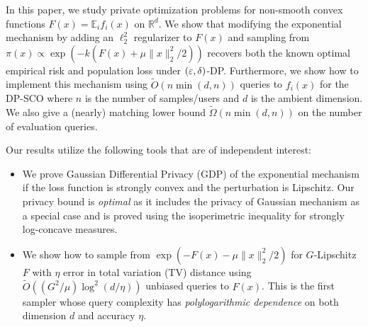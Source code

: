 In this paper, we study private optimization problems for non-smooth convex functions $F(x)=\mathbb{E}_i f_i(x)$ on $\mathbb{R}^d$.
We show that modifying the exponential mechanism by adding an $\ell_2^2$ regularizer to $F(x)$ and sampling from $\pi(x)\propto \exp(-k(F(x)+\mu\|x\|_2^2/2))$ recovers both the known optimal empirical risk and population loss under $(\varepsilon,\delta)$-DP. Furthermore, we show how to implement this mechanism using $\widetilde{O}(n \min(d, n))$ queries to $f_i(x)$ for the DP-SCO where $n$ is the number of samples/users and $d$ is the ambient dimension.
We also give a (nearly) matching lower bound $\widetilde{\Omega}(n \min(d, n))$ on the number of evaluation queries. 

Our results utilize the following tools that are of independent interest:
\begin{itemize}
    \item We prove Gaussian Differential Privacy (GDP) of the exponential mechanism if the loss function is strongly convex and the perturbation is Lipschitz. Our privacy bound is \emph{optimal} as it includes the privacy of Gaussian mechanism as a special case and is proved using the isoperimetric inequality for strongly log-concave measures.
    \item We show how to sample from $\exp(-F(x)-\mu \|x\|^2_2/2)$ for $G$-Lipschitz $F$ with $\eta$ error in total variation (TV) distance using $\widetilde{O}((G^2/\mu) \log^2(d/\eta))$ unbiased queries to $F(x)$. This is the first sampler whose query complexity has \emph{polylogarithmic dependence} on both dimension $d$ and accuracy $\eta$.
\end{itemize}




